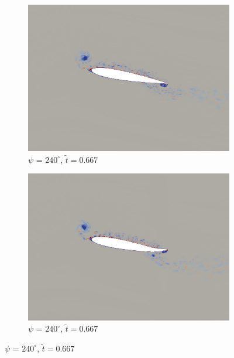 \begin{figure}[H]
	
	\begin{subfigure}[b]{0.4\textwidth}
		\centering
		\includegraphics[width=1\textwidth]{figures/mu_1pt5/vorticity/baseline/phase_240.png}
		\caption{ $\psi$ = $240^\circ$, $\tilde{t}=0.667$}
		\label{fig:mu_1pt5_baseline_psi240}
	\end{subfigure}
	\begin{subfigure}[b]{0.4\textwidth}
		\centering
		\includegraphics[width=1\textwidth]{figures/mu_1pt5/vorticity/AC/phase_240.png}
		\caption{ $\psi$ = $240^\circ$, $\tilde{t}=0.667$}
		\label{fig:mu_1pt5_AC_psi240}
	\end{subfigure}
	

\end{figure}
